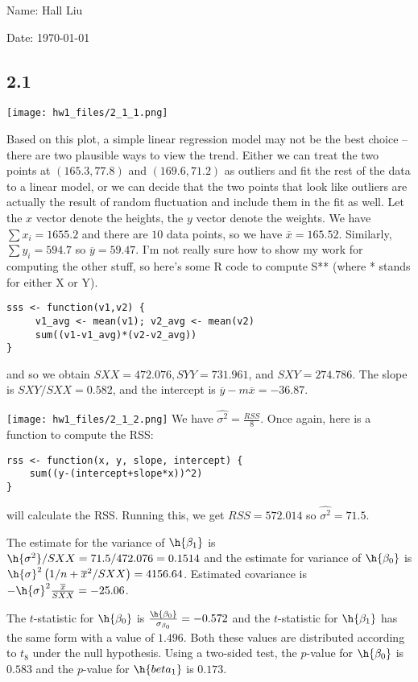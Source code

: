 \documentclass{article}
\newcommand{\conj}{\overline}
\begin{document}
Name: Hall Liu

Date: \today 
\vspace{1.5cm}

\subsection*{2.1}
\texttt{[image: hw1\_files/2\_1\_1.png]}

Based on this plot, a simple linear regression model may not be the best choice -- there are two plausible ways to view the trend. Either we can treat the two points at $(165.3,77.8)$ and $(169.6,71.2)$ as outliers and fit the rest of the data to a linear model, or we can decide that the two points that look like outliers are actually the result of random fluctuation and include them in the fit as well.
Let the $x$ vector denote the heights, the $y$ vector denote the weights. We have $\sum x_i=1655.2$ and there are $10$ data points, so we have $\conj{x}=165.52$. Similarly, $\sum y_i=594.7$ so $\conj{y}=59.47$. I'm not really sure how to show my work for computing the other stuff, so here's some R code to compute S** (where * stands for either X or Y).
\begin{verbatim}
sss <- function(v1,v2) {
     v1_avg <- mean(v1); v2_avg <- mean(v2)
     sum((v1-v1_avg)*(v2-v2_avg))
}
\end{verbatim}

and so we obtain $SXX=472.076,SYY=731.961$, and $SXY=274.786$.
The slope is $SXY/SXX=0.582$, and the intercept is $\conj{y}-m\conj{x}=-36.87$. 

\texttt{[image: hw1\_files/2\_1\_2.png]}
We have $\widehat{\sigma^2}=\frac{RSS}{8}$. Once again, here is a function to compute the RSS:
\begin{verbatim}
rss <- function(x, y, slope, intercept) {
    sum((y-(intercept+slope*x))^2)
}
\end{verbatim}
will calculate the RSS. Running this, we get $RSS=572.014$ so $\widehat{\sigma^2}=71.5$.

The estimate for the variance of $\h{\beta_1}$ is $\h{\sigma^2}/SXX=71.5/472.076=0.1514$ and the estimate for variance of $\h{\beta_0}$ is $\h{\sigma}^2\left(1/n+\conj{x}^2/SXX\right)=4156.64$. Estimated covariance is $-\h{\sigma}^2\frac{\conj{x}}{SXX}=-25.06$.

The $t$-statistic for $\h{\beta_0}$ is $\frac{\h{\beta_0}}{\sigma_{\beta_0}}=-0.572$ and the $t$-statistic for $\h{\beta_1}$ has the same form with a value of $1.496$. Both these values are distributed according to $t_8$ under the null hypothesis. Using a two-sided test, the $p$-value for $\h{\beta_0}$ is $0.583$ and the $p$-value for $\h{beta_1}$ is $0.173$.
\end{document}
